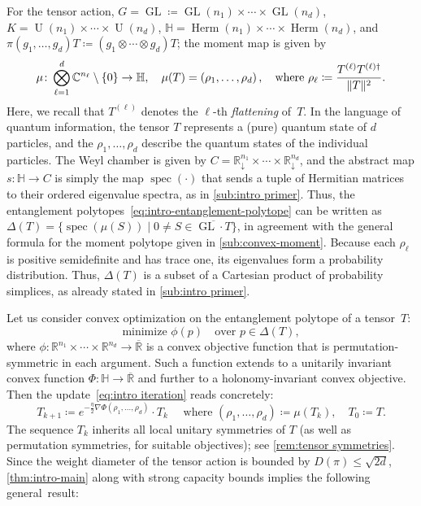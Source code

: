 \documentclass[11pt,letterpaper]{article}
\numberwithin{equation}{section}
\newcommand{\ot}{\otimes}
\newcommand{\RR}{\mathbb{R}}
\newcommand{\CC}{\mathbb{C}}
\newcommand{\bbH}{\mathbb{H}}
\DeclareMathOperator{\U}{U}
\DeclareMathOperator{\spec}{spec}
\DeclareMathOperator{\GL}{GL}
\DeclareMathOperator{\Herm}{Herm}
\DeclarePairedDelimiter\norm{\lVert}{\rVert}
\newcommand{\minproblem}[2]{\text{minimize } #1 \quad \text{over } #2}
\begin{document}
For the tensor action, $G = \GL \coloneqq \GL(n_1)\times\cdots\times\GL(n_d)$, $K = \U(n_1)\times\cdots\times\U(n_d)$, $\bbH = \Herm(n_1)\times\cdots\times\Herm(n_d)$, and $\pi(g_1,\dots,g_d) T \coloneqq (g_1 \ot \cdots \ot g_d) T$; the moment map is given by
\begin{equation}\label{eq:intro mu tensors}
    \mu \colon \bigotimes_{\ell = 1}^d\CC^{n_\ell}\setminus\{0\}\rightarrow\bbH,\quad
    \mu(T) = \left(\rho_1,\dots,\rho_d\right), \quad\text{where } \rho_\ell \coloneqq \frac{T^{(\ell)}T^{(\ell)\dag}}{\norm{T}^2}.
\end{equation}
Here, we recall that $T^{(\ell)}$ denotes the $\ell$-th \emph{flattening} of~$T$.
In the language of quantum information, the tensor $T$ represents a (pure) quantum state of $d$ particles, and the $\rho_1,\dots,\rho_d$ describe the quantum states of the individual particles.
The Weyl chamber is given by $C = \RR^{n_1}_\downarrow \times \cdots \times \RR^{n_d}_\downarrow$, and the abstract map $s \colon \bbH \to C$ is simply the map $\spec(\cdot)$ that sends a tuple of Hermitian matrices to their ordered eigenvalue spectra, as in \cref{sub:intro primer}.
Thus, the entanglement polytopes~\eqref{eq:intro-entanglement-polytope} can be written as
$\Delta(T) = \{ \spec(\mu(S)) \mid 0 \neq S \in \overline{\GL \cdot T} \}$,
in agreement with the general formula for the moment polytope given in \cref{sub:convex-moment}.
Because each $\rho_\ell$ is positive semidefinite and has trace one, its eigenvalues form a probability distribution.
Thus, $\Delta(T)$ is a subset of a Cartesian product of probability simplices, as already stated in \cref{sub:intro primer}.

Let us consider convex optimization on the entanglement polytope of a tensor~$T$:
\[
    \minproblem{\phi(p)}{p \in \Delta(T)},
\]
where $\phi \colon \RR^{n_1}\times\cdots\times\RR^{n_d}\to\overline{\RR}$ is a convex objective function that is permutation-symmetric in each argument.
Such a function extends to a unitarily invariant convex function $\Phi \colon \bbH\to \overline{\RR}$ and further to a holonomy-invariant convex objective.
Then the update~\eqref{eq:intro iteration} reads concretely:
\begin{equation}\label{eq:intro iteration tensors}
    T_{k+1} \coloneqq e^{-\frac\eta2\nabla\Phi(\rho_1,\dots,\rho_d)}\cdot T_k \quad
    \text{ where } (\rho_1,\dots,\rho_d) \coloneqq \mu(T_k),
    \quad
    T_0 \coloneqq T.
\end{equation}
The sequence $T_k$ inherits all local unitary symmetries of $T$ (as well as permutation symmetries, for suitable objectives); see \cref{rem:tensor symmetries}.
Since the weight diameter of the tensor action is bounded by $D(\pi) \leq \sqrt{2d}$, \cref{thm:intro-main} along with strong capacity bounds implies the following general~result:
\end{document}
